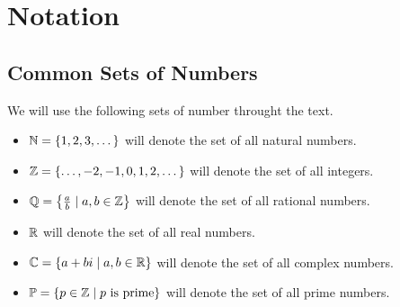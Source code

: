 

\chapter{Notation}
    \section{Common Sets of Numbers}
        \begin{definition}
            We will use the following sets of number throught the text.
            \begin{itemize}
                \item
                    $\mathbb{N} = \left\{1, 2, 3, \dots\right\}$ will denote the set of all natural
                    numbers.
                \item
                    $\mathbb{Z} = \left\{\dots, -2, -1, 0, 1, 2, \dots\right\}$ will denote the set
                    of all integers.
                \item
                    $\mathbb{Q} = \left\{\frac{a}{b} \mid a, b \in \mathbb{Z}\right\}$ will denote the
                    set of all rational numbers.
                \item
                    $\mathbb{R}$ will denote the set of all real numbers.
                \item
                    $\mathbb{C} = \left\{a + bi \mid a, b \in \mathbb{R}\right\}$ will denote the set
                    of all complex numbers.
                \item
                    $\mathbb{P} = \left\{p \in \mathbb{Z} \mid p \mbox{ is prime}\right\}$ will denote
                    the set of all prime numbers.
            \end{itemize}
        \end{definition}

